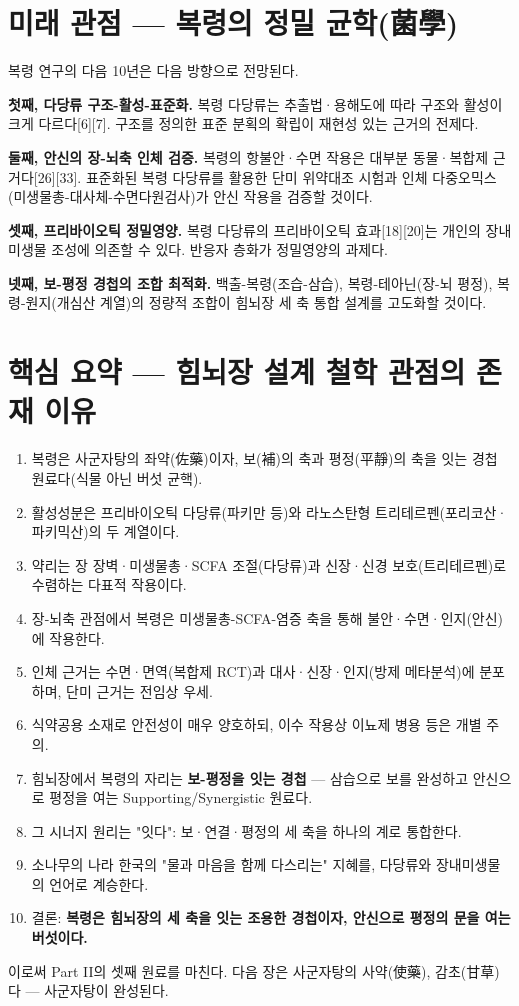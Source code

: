 \documentclass[11pt,oneside]{book}
\begin{document}
\section{미래 관점 — 복령의 정밀 균학(菌學)}
복령 연구의 다음 10년은 다음 방향으로 전망된다.

\textbf{첫째, 다당류 구조-활성-표준화.} 복령 다당류는 추출법·용해도에 따라 구조와 활성이 크게 다르다[6][7]. 구조를 정의한 표준 분획의 확립이 재현성 있는 근거의 전제다.

\textbf{둘째, 안신의 장-뇌축 인체 검증.} 복령의 항불안·수면 작용은 대부분 동물·복합제 근거다[26][33]. 표준화된 복령 다당류를 활용한 단미 위약대조 시험과 인체 다중오믹스(미생물총-대사체-수면다원검사)가 안신 작용을 검증할 것이다.

\textbf{셋째, 프리바이오틱 정밀영양.} 복령 다당류의 프리바이오틱 효과[18][20]는 개인의 장내미생물 조성에 의존할 수 있다. 반응자 층화가 정밀영양의 과제다.

\textbf{넷째, 보-평정 경첩의 조합 최적화.} 백출-복령(조습-삼습), 복령-테아닌(장-뇌 평정), 복령-원지(개심산 계열)의 정량적 조합이 힘뇌장 세 축 통합 설계를 고도화할 것이다.

\section{핵심 요약 — 힘뇌장 설계 철학 관점의 존재 이유}
\begin{enumerate}[leftmargin=6mm,itemsep=1pt,topsep=2pt]
  \item 복령은 사군자탕의 좌약(佐藥)이자, 보(補)의 축과 평정(平靜)의 축을 잇는 경첩 원료다(식물 아닌 버섯 균핵).
  \item 활성성분은 프리바이오틱 다당류(파키만 등)와 라노스탄형 트리테르펜(포리코산·파키믹산)의 두 계열이다.
  \item 약리는 장 장벽·미생물총·SCFA 조절(다당류)과 신장·신경 보호(트리테르펜)로 수렴하는 다표적 작용이다.
  \item 장-뇌축 관점에서 복령은 미생물총-SCFA-염증 축을 통해 불안·수면·인지(안신)에 작용한다.
  \item 인체 근거는 수면·면역(복합제 RCT)과 대사·신장·인지(방제 메타분석)에 분포하며, 단미 근거는 전임상 우세.
  \item 식약공용 소재로 안전성이 매우 양호하되, 이수 작용상 이뇨제 병용 등은 개별 주의.
  \item 힘뇌장에서 복령의 자리는 \textbf{보-평정을 잇는 경첩} — 삼습으로 보를 완성하고 안신으로 평정을 여는 Supporting/Synergistic 원료다.
  \item 그 시너지 원리는 "잇다": 보·연결·평정의 세 축을 하나의 계로 통합한다.
  \item 소나무의 나라 한국의 "물과 마음을 함께 다스리는" 지혜를, 다당류와 장내미생물의 언어로 계승한다.
  \item 결론: \textbf{복령은 힘뇌장의 세 축을 잇는 조용한 경첩이자, 안신으로 평정의 문을 여는 버섯이다.}
\end{enumerate}
이로써 Part II의 셋째 원료를 마친다. 다음 장은 사군자탕의 사약(使藥), 감초(甘草)다 — 사군자탕이 완성된다.
\end{document}
